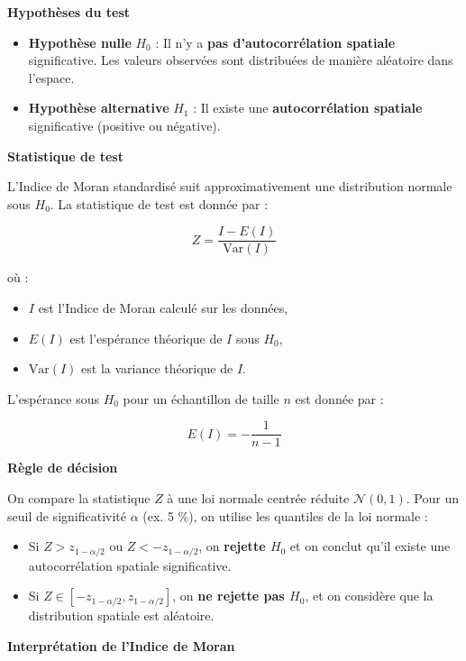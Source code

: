 \documentclass[
]{article}
\begin{document}
\textbf{Hypothèses du test}

\begin{itemize}
    \item \textbf{Hypothèse nulle} \( H_0 \) : Il n’y a \textbf{pas d’autocorrélation spatiale} significative. Les valeurs observées sont distribuées de manière aléatoire dans l’espace.
    \item \textbf{Hypothèse alternative} \( H_1 \) : Il existe une \textbf{autocorrélation spatiale} significative (positive ou négative).
\end{itemize}

\textbf{Statistique de test}

L'Indice de Moran standardisé suit approximativement une distribution
normale sous \(H_0\). La statistique de test est donnée par :

\[
    Z = \frac{I - E(I)}{\text{Var}(I)}
\]

où :

\begin{itemize}
    \item \( I \) est l’Indice de Moran calculé sur les données,
    \item \( E(I) \) est l’espérance théorique de \( I \) sous \( H_0 \),
    \item \( \text{Var}(I) \) est la variance théorique de \( I \).
\end{itemize}

L'espérance sous \(H_0\) pour un échantillon de taille \(n\) est donnée
par :

\[
    E(I) = -\frac{1}{n - 1}
\]

\textbf{Règle de décision}

On compare la statistique \(Z\) à une loi normale centrée réduite
\(\mathcal{N}(0,1)\). Pour un seuil de significativité \(\alpha\) (ex. 5
\%), on utilise les quantiles de la loi normale :

\begin{itemize}
    \item Si \( Z > z_{1-\alpha/2} \) ou \( Z < -z_{1-\alpha/2} \), on \textbf{rejette \( H_0 \)} et on conclut qu’il existe une autocorrélation spatiale significative.
    \item Si \( Z \in [-z_{1-\alpha/2}, z_{1-\alpha/2}] \), on \textbf{ne rejette pas \( H_0 \)}, et on considère que la distribution spatiale est aléatoire.
\end{itemize}

\textbf{Interprétation de l’Indice de Moran}
\end{document}

